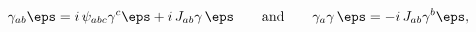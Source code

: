 \begin{equation} 
\gamma_{ab}\eps = i\,\psi_{abc} \gamma ^c \eps + i\,J_{ab} \gamma \,\eps 
\qquad \mbox{and} \qquad 
\gamma_a \gamma \,\eps  = -i\,J_{ab} \gamma ^b \eps ,  
\label{6dga} 
\end{equation} 
